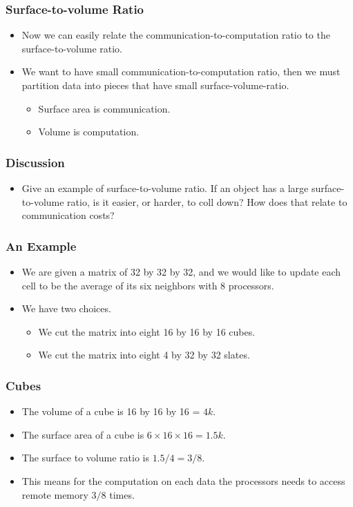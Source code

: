 \documentclass{beamer}
\begin{document}
\begin{CJK}{UTF8}{bsmi}
\begin{frame}
\frametitle{Surface-to-volume Ratio}
\begin{itemize}
\item Now we can easily relate the communication-to-computation ratio
  to the surface-to-volume ratio.
\item We want to have small communication-to-computation ratio, then
  we must partition data into pieces that have small
  surface-volume-ratio.
\begin{itemize}
\item Surface area is communication.
\item Volume is computation.
\end{itemize}
\end{itemize}
\end{frame}

\begin{frame}
\frametitle{Discussion}
\begin{itemize}
\item Give an example of surface-to-volume ratio.  If an object has a
  large surface-to-volume ratio, is it easier, or harder, to coll
  down?  How does that relate to communication costs?
\end{itemize}
\end{frame}

\begin{frame}
\frametitle{An Example}
\begin{itemize}
\item We are given a matrix of 32 by 32 by 32, and we would like to
  update each cell to be the average of its six neighbors with 8
  processors.
\item We have two choices.
\begin{itemize}
\item We cut the matrix into eight 16 by 16 by 16 cubes.
\item We cut the matrix into eight 4 by 32 by 32 slates.
\end{itemize}
\end{itemize}
\end{frame}

\begin{frame}
\frametitle{Cubes}
\begin{itemize}
\item The volume of a cube is 16 by 16 by 16 = $4k$.
\item The surface area of a cube is $6 \times 16 \times 16 = 1.5k$.
\item The surface to volume ratio is $1.5/4 = 3/8$.
\item This means for the computation on each data the processors needs
  to access remote memory $3/8$ times.
\end{itemize}
\end{frame}


\end{CJK}
\end{document}
